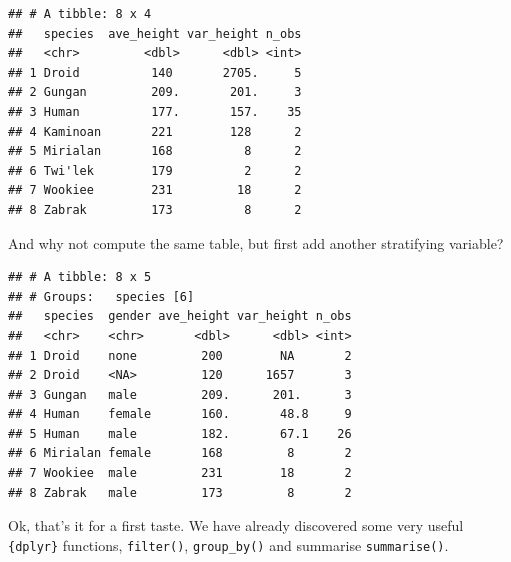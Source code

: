 \documentclass[]{gitbook}
\newenvironment{Shaded}{\begin{snugshade}}{\end{snugshade}}
\newcommand{\DataTypeTok}[1]{\textcolor[rgb]{0.13,0.29,0.53}{#1}}
\newcommand{\DecValTok}[1]{\textcolor[rgb]{0.00,0.00,0.81}{#1}}
\newcommand{\KeywordTok}[1]{\textcolor[rgb]{0.13,0.29,0.53}{\textbf{#1}}}
\newcommand{\NormalTok}[1]{#1}
\newcommand{\OperatorTok}[1]{\textcolor[rgb]{0.81,0.36,0.00}{\textbf{#1}}}
\newcommand{\OtherTok}[1]{\textcolor[rgb]{0.56,0.35,0.01}{#1}}
\newcommand{\StringTok}[1]{\textcolor[rgb]{0.31,0.60,0.02}{#1}}
\theoremstyle{definition}
\theoremstyle{definition}
\theoremstyle{definition}
\theoremstyle{remark}
\begin{document}
\begin{verbatim}
## # A tibble: 8 x 4
##   species  ave_height var_height n_obs
##   <chr>         <dbl>      <dbl> <int>
## 1 Droid          140       2705.     5
## 2 Gungan         209.       201.     3
## 3 Human          177.       157.    35
## 4 Kaminoan       221        128      2
## 5 Mirialan       168          8      2
## 6 Twi'lek        179          2      2
## 7 Wookiee        231         18      2
## 8 Zabrak         173          8      2
\end{verbatim}

And why not compute the same table, but first add another stratifying
variable?

\begin{Shaded}
\end{Shaded}

\begin{verbatim}
## # A tibble: 8 x 5
## # Groups:   species [6]
##   species  gender ave_height var_height n_obs
##   <chr>    <chr>       <dbl>      <dbl> <int>
## 1 Droid    none         200        NA       2
## 2 Droid    <NA>         120      1657       3
## 3 Gungan   male         209.      201.      3
## 4 Human    female       160.       48.8     9
## 5 Human    male         182.       67.1    26
## 6 Mirialan female       168         8       2
## 7 Wookiee  male         231        18       2
## 8 Zabrak   male         173         8       2
\end{verbatim}

Ok, that's it for a first taste. We have already discovered some very
useful \texttt{\{dplyr\}} functions, \texttt{filter()},
\texttt{group\_by()} and summarise \texttt{summarise()}.
\end{document}
